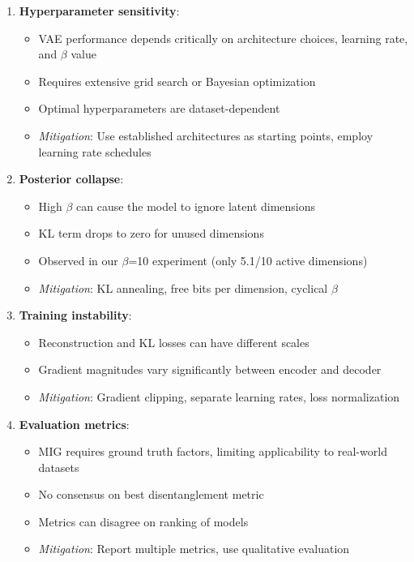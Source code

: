 \documentclass[conference]{IEEEtran}
\begin{document}
\begin{enumerate}
    \item \textbf{Hyperparameter sensitivity}: 
    \begin{itemize}
        \item VAE performance depends critically on architecture choices, learning rate, and $\beta$ value
        \item Requires extensive grid search or Bayesian optimization
        \item Optimal hyperparameters are dataset-dependent
        \item \textit{Mitigation}: Use established architectures as starting points, employ learning rate schedules
    \end{itemize}
    
    \item \textbf{Posterior collapse}: 
    \begin{itemize}
        \item High $\beta$ can cause the model to ignore latent dimensions
        \item KL term drops to zero for unused dimensions
        \item Observed in our $\beta$=10 experiment (only 5.1/10 active dimensions)
        \item \textit{Mitigation}: KL annealing, free bits per dimension, cyclical $\beta$
    \end{itemize}
    
    \item \textbf{Training instability}:
    \begin{itemize}
        \item Reconstruction and KL losses can have different scales
        \item Gradient magnitudes vary significantly between encoder and decoder
        \item \textit{Mitigation}: Gradient clipping, separate learning rates, loss normalization
    \end{itemize}
    
    \item \textbf{Evaluation metrics}: 
    \begin{itemize}
        \item MIG requires ground truth factors, limiting applicability to real-world datasets
        \item No consensus on best disentanglement metric
        \item Metrics can disagree on ranking of models
        \item \textit{Mitigation}: Report multiple metrics, use qualitative evaluation
    \end{itemize}
    

\end{enumerate}
\end{document}
